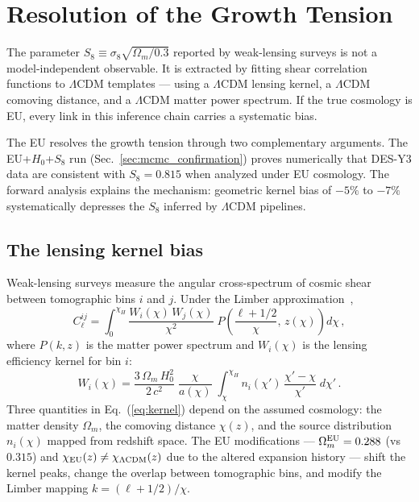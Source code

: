 \documentclass[a4paper,fleqn]{cas-dc}
\begin{document}
\section{Resolution of the Growth Tension}
\label{sec:growth}

The parameter $S_8 \equiv \sigma_8\sqrt{\Omega_m/0.3}$ reported
by weak-lensing surveys is not a model-independent observable.
It is extracted by fitting shear correlation functions to
$\Lambda$CDM templates --- using a $\Lambda$CDM lensing
kernel, a $\Lambda$CDM comoving distance, and a $\Lambda$CDM
matter power spectrum. If the true cosmology is EU, every
link in this inference chain carries a systematic bias.

The EU resolves the growth tension through two complementary
arguments. The EU+$H_0$+$S_8$ run (Sec.~\ref{sec:mcmc_confirmation})
proves numerically that DES-Y3 data are consistent with
$S_8 = 0.815$ when analyzed under EU cosmology. The forward
analysis explains the mechanism: geometric kernel
bias of $-5\%$ to $-7\%$ systematically depresses the
$S_8$ inferred by $\Lambda$CDM pipelines.

\subsection{The lensing kernel bias}
\label{sec:kernel_bias}

Weak-lensing surveys measure the angular cross-spectrum of
cosmic shear between tomographic bins $i$ and $j$. Under the
Limber approximation~\cite{limber1953},
\begin{equation}
C_\ell^{ij} = \int_0^{\chi_H}
  \frac{W_i(\chi)\,W_j(\chi)}{\chi^2}\;
  P\!\left(\frac{\ell + 1/2}{\chi},\, z(\chi)\right)
  d\chi\,,
\label{eq:limber}
\end{equation}
where $P(k,z)$ is the matter power spectrum and $W_i(\chi)$
is the lensing efficiency kernel for bin $i$:
\begin{equation}
W_i(\chi) = \frac{3\,\Omega_m\,H_0^2}{2\,c^2}\;
  \frac{\chi}{a(\chi)}\;
  \int_\chi^{\chi_H}
  n_i(\chi')\,\frac{\chi' - \chi}{\chi'}\;d\chi'\,.
\label{eq:kernel}
\end{equation}
Three quantities in Eq.~(\ref{eq:kernel}) depend on the
assumed cosmology: the matter density $\Omega_m$, the
comoving distance $\chi(z)$, and the source distribution
$n_i(\chi)$ mapped from redshift space. The EU modifications
--- $\Omega_m^{\rm EU} = 0.288$ (vs $0.315$) and
$\chi_{\rm EU}(z) \neq \chi_{\Lambda{\rm CDM}}(z)$ due to
the altered expansion history --- shift the kernel peaks,
change the overlap between tomographic bins, and modify
the Limber mapping $k = (\ell + 1/2)/\chi$.
\end{document}
